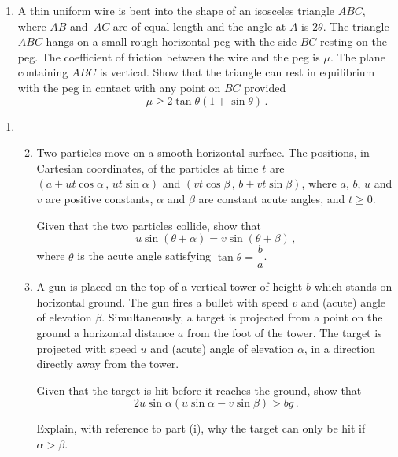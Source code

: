 \documentclass[a4, 11pt]{report}
\newlength{\qspace}
\newcounter{qnumber}
\newenvironment{question}%
 {\vspace{\qspace}
  \begin{enumerate}[\bfseries 1\quad][10]%
    \setcounter{enumi}{\value{qnumber}}%
    \item%
 }
{
  \end{enumerate}
  \filbreak
  \stepcounter{qnumber}
 }
\newenvironment{questionparts}[1][1]%
 {
  \begin{enumerate}[\bfseries (i)]%
    \setcounter{enumii}{#1}
    \addtocounter{enumii}{-1}
    \setlength{\itemsep}{5mm}
    \setlength{\parskip}{8pt}
 }
 {
  \end{enumerate}
 }
\def\ge{\geqslant}
\begin{document}
\begin{question}
A thin uniform wire is bent into the shape of an isosceles 
triangle $ABC$,
where 
$AB$ and~$AC$ are of equal length  and the angle
at $A$ is $2\theta$.
%
The triangle $ABC$  hangs
on a small rough horizontal peg
with the side $BC$ resting on the 
peg. 
 The coefficient of friction between the wire and the peg
is $\mu$.
The  plane containing $ABC$ is vertical.  
Show that the triangle can rest 
in equilibrium with the peg in contact with any point on $BC$ provided 
\[
\mu \ge 2\tan\theta(1+\sin\theta)
\,.
\]
\end{question}


\begin{question}
\begin{questionparts}
\item
Two particles move on a smooth horizontal surface.
The positions, in Cartesian coordinates, of the 
particles at time $t$
are $(a+ut\cos\alpha \,,\, ut\sin\alpha)$  and 
$(vt\cos\beta\,,\, b+vt\sin\beta )$, where $a$, $b$, $u$ and $v$ are positive
constants, $\alpha$ and $\beta$ are constant acute angles, and $t\ge0$.

Given that the two particles collide, show  that 
\[
u \sin(\theta+\alpha)  = v\sin(\theta +\beta)\,,
\]
where $\theta $ is the acute angle satisfying $\tan\theta = \dfrac b a$. 

\item A gun is placed on
 the top of a vertical tower of height $b$ 
which stands
on  horizontal ground. 
The gun fires a  bullet with speed  $v$ and  (acute) angle of 
elevation $\beta$.
Simultaneously, a target
is projected 
from a point on the ground
 a horizontal distance $a$ from the foot of the tower.
The target is projected with speed $u$ and (acute) angle of elevation 
$\alpha$, in a direction
directly away from the tower.
 
Given that  the target is hit before it reaches the ground,
show that
\[
2u\sin\alpha (u\sin\alpha - v\sin\beta)>bg\,.
\]

Explain, with reference to part (i), why the target can
only be hit if  $\alpha>\beta$. 
\end{questionparts}



\end{question}


\newpage
\end{document}
